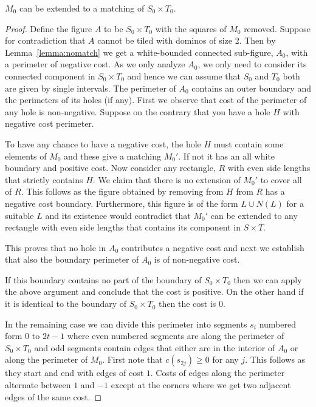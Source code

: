 \documentclass{article}\usepackage[a4paper,margin=20mm]{geometry}
\begin{document}
\begin{lemma}\label{lemma:s0t0}
$M_0$ can be extended to a matching 
of $S_0 \times T_0$.
\end{lemma}

\begin{proof}
Define the figure $A$ to be $S_0 \times
T_0$ with the squares of $M_0$ removed.  Suppose for
contradiction that $A$ cannot be tiled with dominos of size 2.
Then by Lemma~\ref{lemma:nomatch} we get a white-bounded
connected sub-figure, $A_0$, with a perimeter 
of negative cost.  As we only analyze $A_0$, we only need to
consider its connected component in $S_0 \times T_0$
and hence we can assume
that $S_0$ and $T_0$ both are given by single intervals.
The perimeter of $A_0$ contains an outer boundary and the
perimeters of its holes (if any).  First we observe that cost of
the perimeter of any hole is non-negative.  Suppose on the contrary
that you have a hole $H$ with negative cost perimeter.

To have any chance to have a negative cost, the hole $H$ must
contain some elements of $M_0$ and these give
a matching $M_0'$.  If not it has an all white boundary
and positive cost.  Now consider any rectangle, $R$ with even
side lengths that strictly contains $H$.  We claim
that there is no extension of $M_0'$ to cover all of $R$.
This follows as the figure obtained by removing from
$H$ from $R$ has a negative cost boundary.
Furthermore, this figure is of the form $L \cup N(L)$ for a suitable
$L$ and its existence would contradict that $M_0'$ can be extended
to any rectangle with even side lengths that contains
its component in $S\times T$. 

This proves that no hole in $A_0$ contributes a negative
cost and next we establish that also the boundary
perimeter of $A_0$ is of non-negative cost.

If this boundary contains no part of the boundary of $S_0 \times T_0$
then we can apply the above argument and conclude that
the cost is positive.  On the other hand if it is identical
to the boundary of $S_0 \times T_0$ then the cost is 0.

In the remaining case we can 
divide this perimeter into segments $s_i$ numbered
form $0$ to $2t-1$ where even numbered segments
are along the perimeter of $S_0 \times T_0$ and
odd segments contain edges that either are in
the interior of $A_0$ or along the perimeter of
$M_0$.  First note that $c(s_{2j})\geq 0$ for any
$j$.  This follows as they start and end with
edges of cost $1$.  Costs of edges along the perimeter
alternate between $1$ and $-1$ except at the corners
where we get two adjacent edges of the same cost.


\end{proof}
\end{document}

